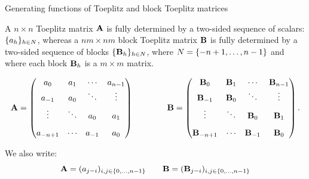 \begin{frame}{Generating functions of Toeplitz and block Toeplitz matrices}
    
  A $n\times n$ Toeplitz matrix $\mathbf{A}$ is fully determined by a two-sided sequence of scalars: $\{a_h\}_{h \in N}$, whereas a $nm \times nm$ block Toeplitz matrix $\mathbf{B}$ is fully determined by a two-sided sequence of blocks $\{\mathbf{B}_h\}_{h \in N}$, where $N = \{-n+1,\dots, n-1 \}$ and where each block $\mathbf{B}_h$ is a $m \times m$ matrix.  

  \begin{equation*}
      \Amat = \begin{pmatrix}
	a_0 & a_{1} & \cdots & a_{n-1} \\ \vspace{0.1cm}
	a_{-1} & a_0 & \ddots & \vdots \\ \vspace{0.3cm}
       \vdots & \ddots & a_{0} & a_{1} \\ 
      a_{-n+1} & \cdots  & a_{-1}    & a_0 
      \end{pmatrix} \quad \quad \quad \quad 
      \Bmat =\begin{pmatrix}
	\Bmat_0 & \Bmat_{1} & \cdots & \Bmat_{n-1} \\ \vspace{0.1cm}
	\Bmat_{-1} & \Bmat_0 & \ddots & \vdots \\ \vspace{0.3cm}
       \vdots & \ddots & \Bmat_0 & \Bmat_{1} \\ 
      \Bmat_{-n+1} & \cdots  & \Bmat_{-1}    & \Bmat_0 
      \end{pmatrix}.
  \end{equation*}

  We also write:
  \begin{equation*}
    \mathbf{A} = (a_{j-i})_{i, j \in \{0, \dots, n-1\}} \quad \quad
    \mathbf{B} = (\mathbf{B}_{j-i})_{i, j \in \{0, \dots, n-1\}}
  \end{equation*}

\end{frame}


